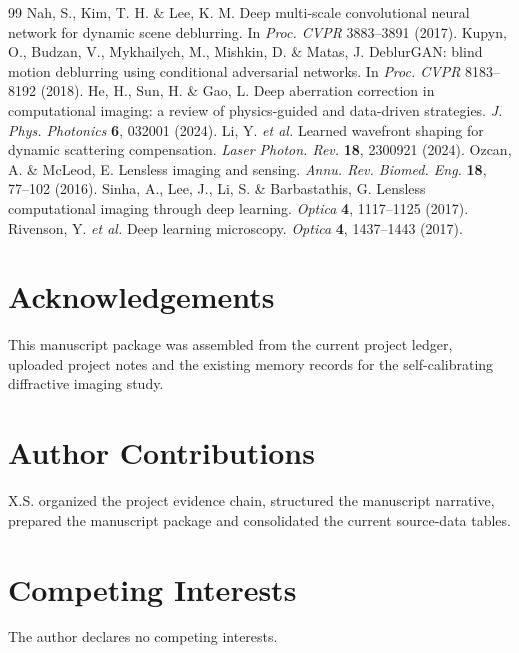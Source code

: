 \documentclass[11pt]{article}
\begin{document}
\begin{thebibliography}{99}
 Nah, S., Kim, T. H. \& Lee, K. M. Deep multi-scale convolutional neural network for dynamic scene deblurring. In \textit{Proc. CVPR} 3883--3891 (2017).
 Kupyn, O., Budzan, V., Mykhailych, M., Mishkin, D. \& Matas, J. DeblurGAN: blind motion deblurring using conditional adversarial networks. In \textit{Proc. CVPR} 8183--8192 (2018).
 He, H., Sun, H. \& Gao, L. Deep aberration correction in computational imaging: a review of physics-guided and data-driven strategies. \textit{J. Phys. Photonics} \textbf{6}, 032001 (2024).
 Li, Y. \textit{et al.} Learned wavefront shaping for dynamic scattering compensation. \textit{Laser Photon. Rev.} \textbf{18}, 2300921 (2024).
 Ozcan, A. \& McLeod, E. Lensless imaging and sensing. \textit{Annu. Rev. Biomed. Eng.} \textbf{18}, 77--102 (2016).
 Sinha, A., Lee, J., Li, S. \& Barbastathis, G. Lensless computational imaging through deep learning. \textit{Optica} \textbf{4}, 1117--1125 (2017).
 Rivenson, Y. \textit{et al.} Deep learning microscopy. \textit{Optica} \textbf{4}, 1437--1443 (2017).
\end{thebibliography}

\section*{Acknowledgements}
This manuscript package was assembled from the current project ledger, uploaded project notes and the existing memory records for the self-calibrating diffractive imaging study.

\section*{Author Contributions}
X.S. organized the project evidence chain, structured the manuscript narrative, prepared the manuscript package and consolidated the current source-data tables.

\section*{Competing Interests}
The author declares no competing interests.
\end{document}
